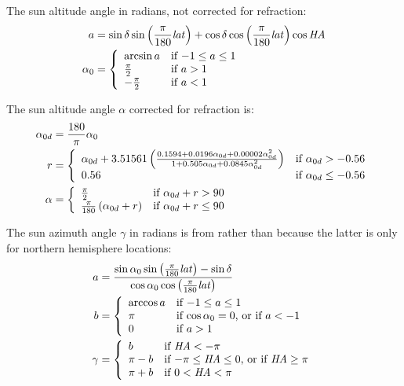 \documentclass[12pt,letterpaper]{article}
\begin{document}
The sun altitude angle in radians, not corrected for refraction:
\begin{align} \label{eqn-elv}
a &= \sin\delta \sin\left(\frac{\pi}{180}\mathit{lat}\right) + \cos\delta \cos\left(\frac{\pi}{180}\mathit{lat}\right) \cos\mathit{HA}\notag\\
\alpha_0 &=\left\{
  \begin{array}{ll}
    \arcsin a & \text{if $-1 \leq a \leq 1$}\\
    \frac{\pi}{2} & \text{if $a>1$}\\
    -\frac{\pi}{2} & \text{if $a<1$}
  \end{array}
\right.
\end{align}

The sun altitude angle $\alpha$ corrected for refraction is:
\begin{align}\label{eqn-elvcorr}
\alpha_{0d} &= \frac{180}{\pi}\alpha_0\notag\\
r &= \left\{
\begin{array}{ll}
\alpha_{0d} + 3.51561\left(\frac{0.1594 + 0.0196\alpha_{0d} + 0.00002\alpha_{0d}^2}{1 + 0.505\alpha_{0d} + 0.0845\alpha_{0d}^2}\right) & \text{if $\alpha_{0d}>-0.56$}\\
0.56 & \text{if $\alpha_{0d} \leq -0.56$}
\end{array}
\right.\notag\\
\alpha & = \left\{
\begin{array}{ll}
\frac{\pi}{2} & \text{if $\alpha_{0d} + r > 90$}\\
\frac{\pi}{180}\left(\alpha_{0d} + r\right) & \text{if $\alpha_{0d} + r \leq 90$}
\end{array}
\right.
\end{align}

The sun azimuth angle $\gamma$ in radians is from \citep{iqbal1983} rather than \citep{michalsky1988} because the latter is only for northern hemisphere locations:
\begin{align}\label{eqn-solaraz}
a &= \frac{\sin\alpha_0 \sin\left(\frac{\pi}{180}\mathit{lat}\right) - \sin\delta}{\cos\alpha_0 \cos\left(\frac{\pi}{180}\mathit{lat}\right)}\notag\\
b &= \left\{
\begin{array}{ll}
\arccos a & \text{if $-1 \leq a \leq 1$}\\
\pi & \text{if $\cos\alpha_0=0$, or if $a < -1$}\\
0 & \text{if $a > 1$}
\end{array}
\right.\notag\\
\gamma &= \left\{
\begin{array}{ll}
b & \text{if $\mathit{HA} < -\pi$}\\
\pi - b & \text{if $-\pi \leq \mathit{HA} \leq 0$, or if $\mathit{HA} \geq \pi$}\\
\pi + b & \text{if $0 < \mathit{HA} < \pi$}
\end{array}
\right.
\end{align}
\end{document}
